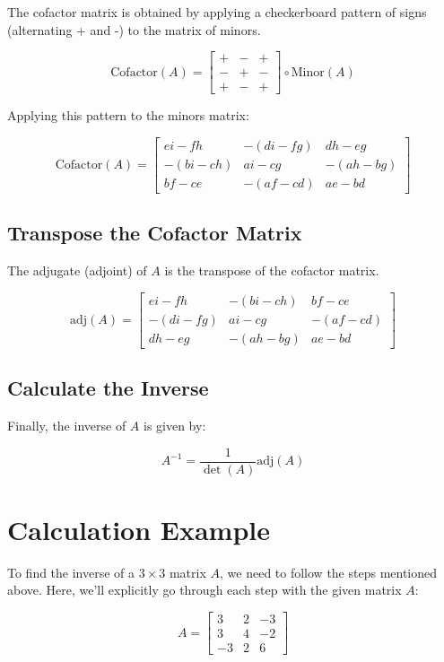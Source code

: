 \documentclass{article}
\begin{document}
   The cofactor matrix is obtained by applying a checkerboard pattern of signs (alternating + and -) to the matrix of minors.

   \[
   \text{Cofactor}(A) = \begin{bmatrix}
   + & - & + \\
   - & + & - \\
   + & - & +
   \end{bmatrix} \circ \text{Minor}(A)
   \]

   Applying this pattern to the minors matrix:

   \[
   \text{Cofactor}(A) = \begin{bmatrix}
   ei - fh & -(di - fg) & dh - eg \\
   -(bi - ch) & ai - cg & -(ah - bg) \\
   bf - ce & -(af - cd) & ae - bd
   \end{bmatrix}
   \]

\subsection{Transpose the Cofactor Matrix}

   The adjugate (adjoint) of \(A\) is the transpose of the cofactor matrix.

   \[
   \text{adj}(A) = \begin{bmatrix}
   ei - fh & -(bi - ch) & bf - ce \\
   -(di - fg) & ai - cg & -(af - cd) \\
   dh - eg & -(ah - bg) & ae - bd
   \end{bmatrix}
   \]

\subsection{Calculate the Inverse}

   Finally, the inverse of \(A\) is given by:

   \[
   A^{-1} = \frac{1}{\det(A)} \text{adj}(A)
   \]

\section{Calculation Example}
To find the inverse of a \(3 \times 3\) matrix \(A\), we need to follow the steps mentioned above. Here, we'll explicitly go through each step with the given matrix \(A\):

\[
A = \begin{bmatrix}
3 & 2 & -3 \\
3 & 4 & -2 \\
-3 & 2 & 6
\end{bmatrix}
\]
\end{document}

